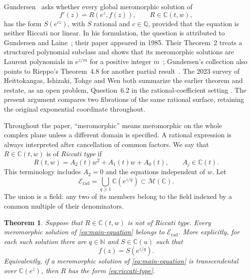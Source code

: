 \documentclass[11pt,reqno]{amsart}
\numberwithin{equation}{section}
\newtheorem{theorem}{Theorem}[section]
\theoremstyle{definition}
\theoremstyle{remark}
\newcommand{\C}{\mathbb C}
\newcommand{\N}{\mathbb N}
\newcommand{\Q}{\mathbb Q}
\newcommand{\MM}{\mathcal M}
\newcommand{\Erad}{\mathscr E_{\mathrm{rad}}}
\begin{document}
Gundersen~\cite[Question~6.2]{Gundersen2017} asks whether every global
meromorphic solution of
\begin{equation}
 f'(z)=R(e^z,f(z)),\qquad R\in\C(t,w),
 \label{eq:main-equation}
\end{equation}
has the form $S(e^{cz})$, with $S$ rational and $c\in\Q$, provided that the
equation is neither Riccati nor linear. In his formulation, the question
is attributed to Gundersen and Laine~\cite{GundersenLaine1985}; their
paper appeared in 1985. Their Theorem~2 treats a structured polynomial
subclass and shows that its meromorphic solutions are Laurent polynomials
in $e^{z/m}$ for a positive integer $m$~\cite[Theorem~2]{GundersenLaine1985};
Gundersen's collection also points to Rieppo's Theorem~4.8 for another partial
result~\cite{Rieppo1998}. The 2023 survey of Heittokangas, Ishizaki,
Tohge and Wen both summarize the earlier theorem and restate, as an
open problem, Question~6.2 in the rational-coefficient setting
\cite[Section~4.4]{HeittokangasEtAl2023}.
The present argument compares two fibrations of the same rational
surface, retaining the original exponential coordinate throughout.

Throughout the paper, ``meromorphic'' means meromorphic on the whole
complex plane unless a different domain is specified. A rational
expression is always interpreted after cancellation of common factors.
We say that $R\in\C(t,w)$ is of \emph{Riccati type} if
\begin{equation}
 R(t,w)=A_2(t)w^2+A_1(t)w+A_0(t),
 \qquad A_j\in\C(t).
 \label{eq:riccati-type}
\end{equation}
This terminology includes $A_2=0$ and the equations independent of $w$.
Let
\begin{equation}
 \Erad=\bigcup_{q\geq1}\C(e^{z/q})\subset\MM(\C).
 \label{eq:radical-field}
\end{equation}
The union is a field: any two of its members belong to the field indexed
by a common multiple of their denominators.

\begin{theorem}
\label{thm:main}
Suppose that $R\in\C(t,w)$ is not of Riccati type. Every meromorphic
solution of \eqref{eq:main-equation} belongs to $\Erad$. More explicitly,
for each such solution there are $q\in\N$ and $S\in\C(u)$ such that
\begin{equation}
 f(z)=S(e^{z/q}).
 \label{eq:main-conclusion}
\end{equation}
Equivalently, if a meromorphic solution of \eqref{eq:main-equation} is
transcendental over $\C(e^z)$, then $R$ has the form
\eqref{eq:riccati-type}.
\end{theorem}
\end{document}

